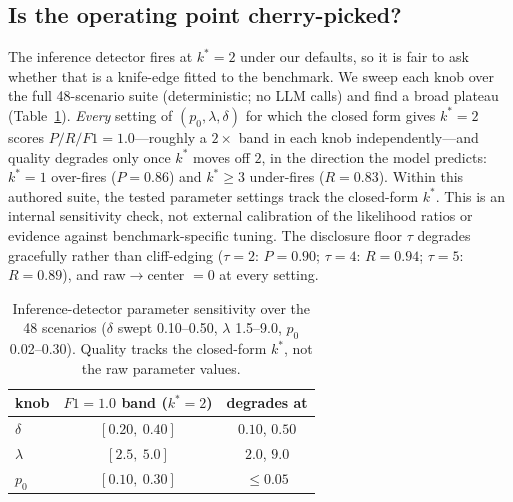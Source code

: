 \subsection{Is the operating point cherry-picked?}
The inference detector fires at $k^{*}{=}2$ under our defaults, so it is fair to ask
whether that is a knife-edge fitted to the benchmark. We sweep each knob over the full
48-scenario suite (deterministic; no LLM calls) and find a broad plateau
(Table~\ref{tab:sens}). \emph{Every} setting of $(p_0,\lambda,\delta)$ for which the
closed form gives $k^{*}{=}2$ scores $P/R/F1=1.0$---roughly a $2\times$ band in each
knob independently---and quality degrades only once $k^{*}$ moves off $2$, in the
direction the model predicts: $k^{*}{=}1$ over-fires ($P{=}0.86$) and $k^{*}\ge3$
under-fires ($R{=}0.83$). Within this authored suite, the tested parameter settings track the
closed-form $k^{*}$. This is an internal sensitivity check, not external
calibration of the likelihood ratios or evidence against benchmark-specific tuning. The disclosure floor $\tau$ degrades gracefully rather than cliff-edging
($\tau{=}2$: $P{=}0.90$; $\tau{=}4$: $R{=}0.94$; $\tau{=}5$: $R{=}0.89$), and
raw$\to$center $=0$ at every setting.

\begin{table}[t]\centering\small
\begin{tabular}{lcc}
\toprule
knob & $F1{=}1.0$ band ($k^{*}{=}2$) & degrades at \\
\midrule
$\delta$  & $[0.20,\ 0.40]$ & $0.10$, $0.50$ \\
$\lambda$ & $[2.5,\ 5.0]$   & $2.0$, $9.0$ \\
$p_0$     & $[0.10,\ 0.30]$ & $\le 0.05$ \\
\bottomrule
\end{tabular}
\caption{Inference-detector parameter sensitivity over the 48 scenarios
($\delta$ swept 0.10--0.50, $\lambda$ 1.5--9.0, $p_0$ 0.02--0.30). Quality tracks the
closed-form $k^{*}$, not the raw parameter values.}
\label{tab:sens}
\end{table}



